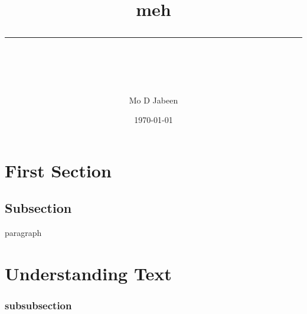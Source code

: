 \documentclass[11pt]{scrartcl} %
\title{	
	\normalfont\normalsize
	\vspace{20pt} %
	{\huge meh}\\ %
	\vspace{12pt} %
	\rule{\linewidth}{2pt}\\ %
}
\author{\small Mo D Jabeen} %
\date{\normalsize\today} %
\begin{document}
\maketitle %

\section{First Section}

\subsection{Subsection}

paragraph

\section{Understanding Text}

\subsubsection{subsubsection}





\end{document}
